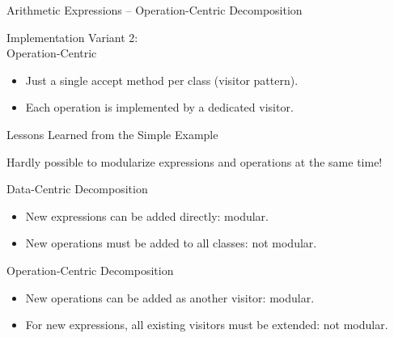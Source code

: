 \begin{frame}{Arithmetic Expressions -- Operation-Centric Decomposition}
	\begin{mycolumns}[widths={40}]
		\begin{definition}{Implementation Variant 2:\\Operation-Centric}
			\begin{itemize}
				\item Just a single accept method per class (visitor pattern).
				\item Each operation is implemented by a dedicated visitor.				
			\end{itemize}
		\end{definition}
	\mynextcolumn
		\begin{exampletight}{}
		\end{exampletight}
	\end{mycolumns}
\end{frame}

\begin{frame}{Lessons Learned from the Simple Example}
	\begin{note}{}
		Hardly possible to modularize expressions and operations at the same time!
	\end{note}
	\pause
	\begin{mycolumns}
		\begin{note}{Data-Centric Decomposition}
			\begin{itemize}
				\item New expressions can be added directly: modular.
				\item New operations must be added to all classes: not modular.
			\end{itemize}
		\end{note}
	\mynextcolumn
		\begin{note}{Operation-Centric Decomposition}
			\begin{itemize}
				\item New operations can be added as another visitor: modular.
				\item For new expressions, all existing visitors must be extended: not modular.
			\end{itemize}
		\end{note}	
	\end{mycolumns}
\end{frame}